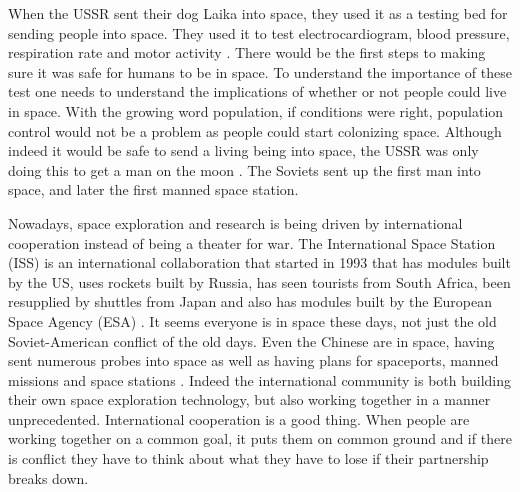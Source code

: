 \documentclass[a4paper,12pt]{article}
\begin{document}
When the USSR sent their dog Laika into space, they used it as a testing bed for sending people into space. They used it to test electrocardiogram, blood pressure, respiration rate and motor activity \autocite{west2001}. There would be the first steps to making sure it was safe for humans to be in space. To understand the importance of these test one needs to understand the implications of whether or not people could live in space. With the growing word population, if conditions were right, population control would not be a problem as people could start colonizing space. Although indeed it would be safe to send a living being into space, the USSR was only doing this to get a man on the moon \autocite{west2001}. The Soviets sent up the first man into space, and later the first manned space station.

Nowadays, space exploration and research is being driven by international cooperation instead of being a theater for war. The International Space Station (ISS) is an international collaboration that started in 1993 that has modules built by the US, uses rockets built by Russia, has seen tourists from South Africa, been resupplied by shuttles from Japan and also has modules built by the European Space Agency (ESA) \autocite{funk2014}. It seems everyone is in space these days, not just the old Soviet-American conflict of the old days. Even the Chinese are in space, having sent numerous probes into space as well as having plans for spaceports, manned missions and space stations \autocite{jolly2013}. Indeed the international community is both building their own space exploration technology, but also working together in a manner unprecedented. International cooperation is a good thing. When people are working together on a common goal, it puts them on common ground and if there is conflict they have to think about what they have to lose if their partnership breaks down. 
\end{document}
